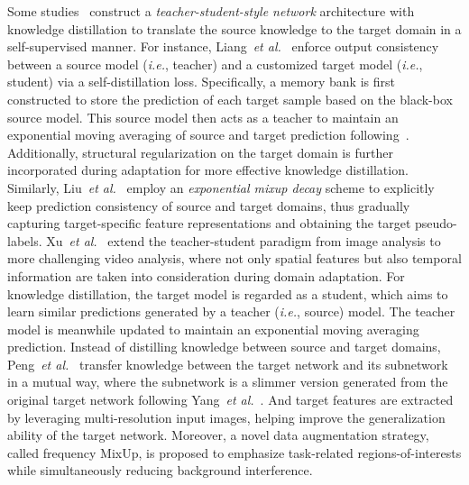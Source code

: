 \documentclass[10pt,journal,compsoc]{IEEEtran}
\def\etal{{\em et al.}}
\def\ie{{\em i.e.}}
\begin{document}
Some studies~\cite{liang2022dine, liang2021distill, liu2022unsupervised1, liu2022unsupervised2, xu2022extern, peng2022toward} construct a \emph{teacher-student-style network} architecture with knowledge distillation to translate the source knowledge to the target domain in a self-supervised manner.
For instance, Liang~\etal~\cite{liang2022dine, liang2021distill} enforce output consistency between a source model (\ie, teacher) and a customized target model (\ie, student) via a self-distillation loss.
Specifically, a memory bank is first constructed to store the prediction of each target sample based on the black-box source model.
This source model then acts as a teacher to maintain an exponential moving averaging of source and target prediction following~\cite{laine2016temporal, kim2021self}. 
Additionally, structural regularization on the target domain is further incorporated during adaptation for more effective knowledge distillation.
Similarly, Liu~\etal~\cite{liu2022unsupervised1, liu2022unsupervised2}
employ an \emph{exponential mixup decay} scheme to explicitly keep prediction consistency of source and target domains, thus gradually capturing target-specific feature representations and obtaining the target pseudo-labels.
Xu~\etal~\cite{xu2022extern} extend the teacher-student paradigm from image analysis %
to more challenging video analysis, where not only spatial features but also temporal information are taken into consideration during domain adaptation.
For knowledge distillation, the target model is regarded as a student, which aims to learn similar predictions generated by a teacher (\ie, source) model.
The teacher model is meanwhile updated to maintain an exponential moving averaging prediction.
Instead of distilling knowledge between source and target domains, Peng~\etal~\cite{peng2022toward} transfer knowledge between the target network and its subnetwork in a mutual way, where the subnetwork is a slimmer version generated from the original target network following Yang~\etal~\cite{yang2020mutualnet}.
And target features are extracted by leveraging multi-resolution input images, helping improve the generalization ability of the target network.
Moreover, a novel data augmentation strategy, called frequency MixUp, is proposed to emphasize task-related regions-of-interests while simultaneously reducing background interference. 
\end{document}
